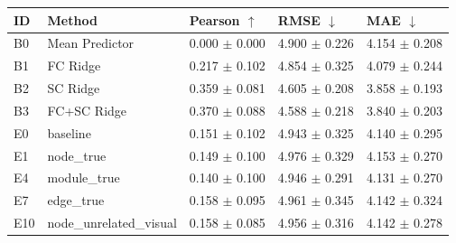 \begin{tabular}{lllll}
\toprule
ID & Method & Pearson $\uparrow$ & RMSE $\downarrow$ & MAE $\downarrow$ \\
\midrule
B0 & Mean Predictor & 0.000 $\pm$ 0.000 & 4.900 $\pm$ 0.226 & 4.154 $\pm$ 0.208 \\
B1 & FC Ridge & 0.217 $\pm$ 0.102 & 4.854 $\pm$ 0.325 & 4.079 $\pm$ 0.244 \\
B2 & SC Ridge & 0.359 $\pm$ 0.081 & 4.605 $\pm$ 0.208 & 3.858 $\pm$ 0.193 \\
B3 & FC+SC Ridge & 0.370 $\pm$ 0.088 & 4.588 $\pm$ 0.218 & 3.840 $\pm$ 0.203 \\
E0 & baseline & 0.151 $\pm$ 0.102 & 4.943 $\pm$ 0.325 & 4.140 $\pm$ 0.295 \\
E1 & node_true & 0.149 $\pm$ 0.100 & 4.976 $\pm$ 0.329 & 4.153 $\pm$ 0.270 \\
E4 & module_true & 0.140 $\pm$ 0.100 & 4.946 $\pm$ 0.291 & 4.131 $\pm$ 0.270 \\
E7 & edge_true & 0.158 $\pm$ 0.095 & 4.961 $\pm$ 0.345 & 4.142 $\pm$ 0.324 \\
E10 & node_unrelated_visual & 0.158 $\pm$ 0.085 & 4.956 $\pm$ 0.316 & 4.142 $\pm$ 0.278 \\
\bottomrule
\end{tabular}
